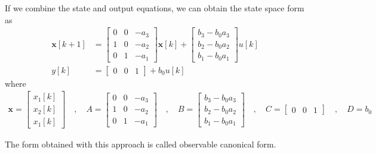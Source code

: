 \documentclass[twoside]{article}
\begin{document}
%
If we combine the state and output equations, we
can obtain the state space form as
%
%
\begin{align*}
  \mathbf{x}[k+1] &= \left[ \begin{array}{ccc} 0 & 0 & -a_3 \\ 1 & 0 & -a_2
    \\ 0 & 1 & -a_1 \end{array} \right] \mathbf{x}[k]
   + 
  \left[ \begin{array}{c} b_3 - b_0 a_3 \\ b_2 - b_0 a_2
    \\ b_1 - b_0 a_1 \end{array} \right] u[k]
\\
y[k] &= \left[ \begin{array}{ccc} 0 & 0 & 1 \end{array} \right]
+ b_0 u[k]
\end{align*}
%
where 
%
\begin{align*}
\mathbf{x} = \left[ \begin{array}{c} x_1[k] \\ x_2[k] \\
x_1[k] \end{array} \right] \quad , \quad
A = \left[ \begin{array}{ccc} 0 & 0 & -a_3 \\ 1 & 0 & -a_2
    \\ 0 & 1 & -a_1 \end{array} \right]
\quad , \quad 
B = \left[ \begin{array}{c} b_3 - b_0 a_3 \\ b_2 - b_0 a_2
    \\ b_1 - b_0 a_1 \end{array} \right]
\quad , \quad
C = \left[ \begin{array}{ccc} 0 & 0 & 1 \end{array} \right]
\quad , \quad
D = b_0
\end{align*}
%

The form obtained with this approach is called
observable canonical form. 
\end{document}
